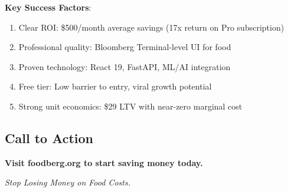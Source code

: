 \documentclass[11pt,a4paper]{article}
\begin{document}
\textbf{Key Success Factors}:
\begin{enumerate}
    \item Clear ROI: \$500/month average savings (17x return on Pro subscription)
    \item Professional quality: Bloomberg Terminal-level UI for food
    \item Proven technology: React 19, FastAPI, ML/AI integration
    \item Free tier: Low barrier to entry, viral growth potential
    \item Strong unit economics: \$29 LTV with near-zero marginal cost
\end{enumerate}

\subsection*{Call to Action}
\begin{center}
\textbf{Visit foodberg.org to start saving money today.}

\textit{Stop Losing Money on Food Costs.}
\end{center}
\end{document}
